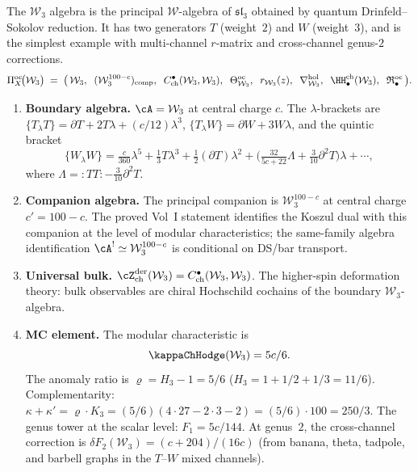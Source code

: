 \begin{computation}
\label{comp:platonic-W3}
The $\mathcal{W}_3$ algebra is the principal $\mathcal{W}$-algebra
of $\mathfrak{sl}_3$ obtained by quantum Drinfeld--Sokolov
reduction. It has two generators $T$ (weight~$2$) and $W$ (weight~$3$),
and is the simplest example with multi-channel $r$-matrix and
cross-channel genus-$2$ corrections.
\begin{equation}\label{eq:platonic-W3}
\Pi^{\mathrm{oc}}_X\!\bigl(\mathcal{W}_3\bigr)
\;=\;
\bigl(\,
\mathcal{W}_3,\;\;
(\mathcal{W}_3^{100-c})_{\mathrm{comp}},\;\;
C^\bullet_{\mathrm{ch}}(\mathcal{W}_3, \mathcal{W}_3),\;\;
\Theta^{\mathrm{oc}}_{\mathcal{W}_3},\;\;
r_{\mathcal{W}_3}(z),\;\;
\nabla^{\mathrm{hol}}_{\mathcal{W}_3},\;\;
\HH^{\mathrm{ch}}_\bullet(\mathcal{W}_3),\;\;
\mathfrak{R}^{\mathrm{oc}}_\bullet
\,\bigr).
\end{equation}
\begin{enumerate}[label=\textup{(\roman*)},nosep]
\item \textbf{Boundary algebra.}
 $\cA = \mathcal{W}_3$ at central charge $c$.
 The $\lambda$-brackets are
 $\{T_\lambda T\} = \partial T + 2T\lambda + (c/12)\lambda^3$,\;
 $\{T_\lambda W\} = \partial W + 3W\lambda$, and
 the quintic bracket
 \[
 \{W_\lambda W\}
 = \tfrac{c}{360}\lambda^5 + \tfrac{1}{3}T\lambda^3
 + \tfrac{1}{2}(\partial T)\lambda^2
 + \bigl(\tfrac{32}{5c+22}\Lambda + \tfrac{3}{10}\partial^2 T\bigr)\lambda
 + \cdots,
 \]
 where $\Lambda = {:}TT{:} - \tfrac{3}{10}\partial^2 T$.

\item \textbf{Companion algebra.}
 The principal companion is $\mathcal{W}_3^{100-c}$ at central
 charge $c' = 100 - c$. The proved Vol~I statement identifies
 the Koszul dual with this companion at the level of modular
 characteristics; the same-family algebra identification
 $\cA^! \simeq \mathcal{W}_3^{100-c}$ is conditional on DS/bar
 transport.

\item \textbf{Universal bulk.}
 $\cZ^{\mathrm{der}}_{\mathrm{ch}}(\mathcal{W}_3)
 = C^\bullet_{\mathrm{ch}}(\mathcal{W}_3, \mathcal{W}_3)$.
 The higher-spin deformation theory: bulk observables are
 chiral Hochschild cochains of the boundary $\mathcal{W}_3$-algebra.

\item \textbf{MC element.}
 The modular characteristic is
 \begin{equation}\label{eq:platonic-kappa-W3}
 \kappaChHodge(\mathcal{W}_3) = 5c/6.
 \end{equation}
 The anomaly ratio is $\varrho = H_3 - 1 = 5/6$
 \textup{(}$H_3 = 1 + 1/2 + 1/3 = 11/6$\textup{)}.
 Complementarity:
 $\kappa + \kappa' = \varrho \cdot K_3
 = (5/6)(4 \cdot 27 - 2 \cdot 3 - 2)
 = (5/6) \cdot 100 = 250/3$.
 The genus tower at the scalar level: $F_1 = 5c/144$.
 At genus~$2$, the cross-channel correction is
 $\delta F_2(\mathcal{W}_3) = (c + 204)/(16c)$
 \textup{(}from banana, theta, tadpole, and barbell graphs in the
 $T$--$W$ mixed channels\textup{)}.


\end{enumerate}
\end{computation}
